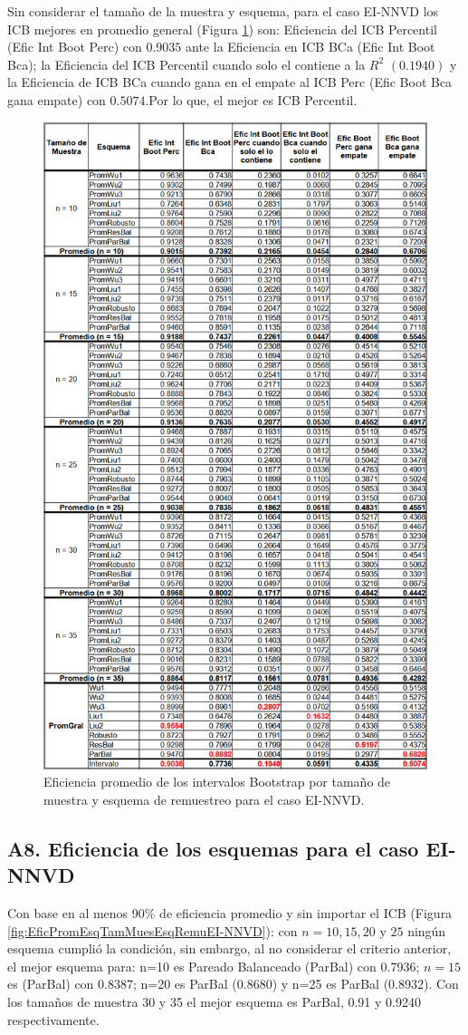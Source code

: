 Sin considerar el tamaño de la muestra y esquema, para el caso EI-NNVD los ICB mejores en promedio general (Figura \ref{fig:EficPromIntBootsTamMuestEsqRemuEI-NNVD}) son: Eficiencia del ICB Percentil (Efic Int Boot Perc) con $0.9035$ ante la Eficiencia en ICB BCa (Efic Int Boot Bca); la Eficiencia del ICB Percentil cuando solo el contiene a la $R^{2}$ $(0.1940)$ y la Eficiencia de ICB BCa cuando gana en el empate al ICB Perc (Efic Boot Bca gana empate) con $0.5074$.Por lo que, el mejor es ICB Percentil.

\begin{figure}[ht] 
	\centering 
	\includegraphics[width=0.55\linewidth]{img/EI_NNVD_Efic_Boots.png} 
	\caption{Eficiencia promedio de los intervalos Bootstrap por tamaño de muestra y esquema de remuestreo para el caso EI-NNVD.} 
	\label{fig:EficPromIntBootsTamMuestEsqRemuEI-NNVD}
\end{figure}
\FloatBarrier


\subsection*{A8. Eficiencia de los esquemas para el caso EI-NNVD}

Con base en al menos 90\% de eficiencia promedio y sin importar el ICB (Figura \ref{fig:EficPromEsqTamMuesEsqRemuEI-NNVD}): con $n=10, 15, 20$ y $25$ ningún esquema cumplió la condición, sin embargo, al no considerar el criterio anterior, el mejor esquema para: n=10 es Pareado Balanceado (ParBal) con 0.7936; $n=15$ es (ParBal) con 0.8387;  n=20 es ParBal (0.8680) y  n=25 es ParBal (0.8932). Con los tamaños de muestra 30 y 35 el mejor esquema es ParBal, 0.91 y 0.9240 respectivamente.\\

